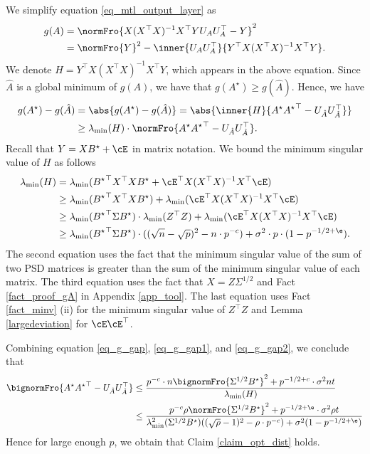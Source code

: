 \documentclass[aos,preprint]{imsart}
\begin{document}
	We simplify equation \eqref{eq_mtl_output_layer} as
	\begin{align*}
		g(A)  &= \normFro{X (X^{\top}X)^{-1} X^{\top} Y U_A U_A^{\top} - Y}^2 \\
					&= \normFro{Y}^2 - \inner{U_A U_A^{\top}}{Y^{\top} X (X^{\top} X)^{-1} X^{\top} Y}.
	\end{align*}
	We denote $H = Y^{\top} X (X^{\top} X)^{-1} X^{\top} Y$, which appears in the above equation.
	Since $\hat{A}$ is a global minimum of $g(A)$, we have that $g(A^{\star}) \ge g(\hat{A})$.
	Hence, we have
	\begin{align}
		g(A^{\star}) - g(\hat{A}) &= \abs{g(A^{\star}) - g(\hat{A})} = \abs{\inner{H}{A^{\star} {A^{\star}}^{\top} - U_{\hat{A}} U_{\hat{A}}^{\top}}} \nonumber \\
												&\ge \lambda_{\min}(H) \cdot \normFro{A^{\star} {A^{\star}}^{\top} - U_{\hat{A}} U_{\hat{A}}^{\top}}. \label{eq_g_gap1}
	\end{align}
	Recall that $Y = X B^{\star} + \cE$ in matrix notation.
	We bound the minimum singular value of $H$ as follows
	\begin{align}
		\lambda_{\min}(H) &= \lambda_{\min}({B^{\star}}^{\top} X^{\top} X B^{\star} + \cE^{\top} X (X^{\top} X)^{-1} X^{\top} \cE) \nonumber \\
		&\ge \lambda_{\min}({B^{\star}}^{\top}X^{\top}X B^{\star}) + \lambda_{\min}(\cE^{\top} X (X^{\top} X)^{-1} X^{\top} \cE) \nonumber \\
		&\ge \lambda_{\min}({B^{\star}}^{\top}\Sigma B^{\star}) \cdot \lambda_{\min}(Z^{\top}Z) + \lambda_{\min}(\cE^{\top} X (X^{\top} X)^{-1} X^{\top} \cE) \nonumber \\
		&\ge \lambda_{\min}({B^{\star}}^{\top}\Sigma B^{\star}) \cdot ((\sqrt n - \sqrt p)^2 - n \cdot p^{-c}) + \sigma^2 \cdot p \cdot (1 - p^{-1/2 + \e}). \label{eq_g_gap2}
	\end{align}
	The second equation uses the fact that the minimum singular value of the sum of two PSD matrices is greater than the sum of the minimum singular value of each matrix.
	The third equation uses the fact that $X = Z \Sigma^{1/2}$ and Fact \ref{fact_proof_gA} in Appendix \ref{app_tool}.
	The last equation uses Fact \ref{fact_minv} (ii) for the minimum singular value of $Z^{\top}Z$ and Lemma \ref{largedeviation} for $\cE\cE^{\top}$.

	Combining equation \eqref{eq_g_gap}, \eqref{eq_g_gap1}, and \eqref{eq_g_gap2}, we conclude that
	\begin{align*}
		\bignormFro{A^{\star} {A^{\star}}^{\top}- U_{\hat{A}} U_{\hat{A}}^{\top}}
		&\le \frac{p^{-c} \cdot n \bignormFro{\Sigma^{1/2} B^{\star}}^2 + p^{-1/2 + c} \cdot \sigma^2 nt} {\lambda_{\min}(H)} \\
		&\le \frac{p^{-c} \rho \normFro{\Sigma^{1/2} B^{\star}}^2 + p^{-1/2 + \e} \cdot \sigma^2 \rho t}{\lambda_{\min}^2(\Sigma^{1/2} B^{\star}) ((\sqrt{\rho} - 1)^2 - \rho \cdot p^{-c}) + \sigma^2 (1 - p^{-1/2 + \e})}
	\end{align*}
	Hence for large enough $p$, we obtain that Claim \ref{claim_opt_dist} holds.
	\fi
	
\end{document}
